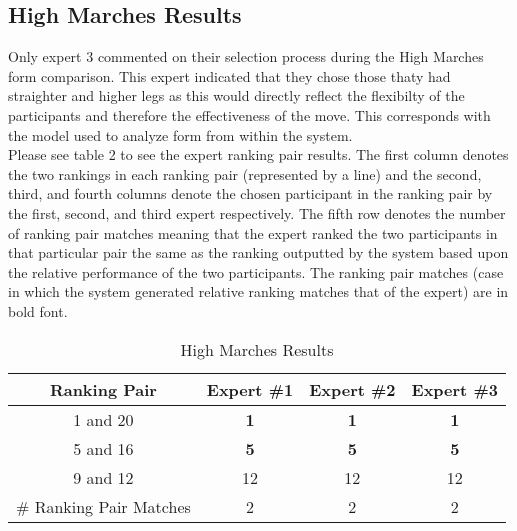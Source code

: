 \subsection{High Marches Results}
Only expert 3 commented on their selection process during the High Marches form comparison.  This expert indicated that they chose those thaty had straighter and higher legs as this would directly reflect the flexibilty of the participants and therefore the effectiveness of the move.  This corresponds with the model used to analyze form from within the system.\\
Please see table 2 to see the expert ranking pair results.  The first column denotes the two rankings in each ranking pair (represented by a line) and the second, third, and fourth columns denote the chosen participant in the ranking pair by the first, second, and third expert respectively.  The fifth row denotes the number of ranking pair matches meaning that the expert ranked the two participants in that particular pair the same as the ranking outputted by the system based upon the relative performance of the two participants. The ranking pair matches (case in which the system generated relative ranking matches that of the expert) are in bold font.\\

\begin{table}[h!]
\caption{High Marches Results}
\centering
\begin{tabular}{c c c c}
\hline \hline
Ranking Pair & Expert \#1 & Expert \#2 & Expert \#3 \\ [0.5ex]
\hline
1 and 20 &		\textbf{1}&		\textbf{1}&		\textbf{1} \\
5 and 16 &		\textbf{5}&		\textbf{5}&		\textbf{5} \\
9 and 12 &		12&				12&				12 \\
\hline
\# Ranking Pair Matches &		2&		2&		2 \\
\end{tabular}
\label{table:highmarchesresult}
\end{table}

